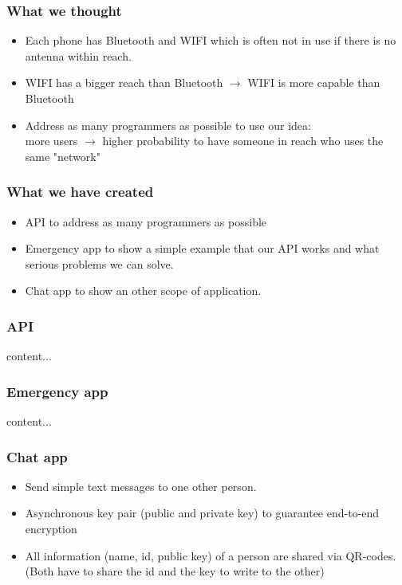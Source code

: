 \documentclass[11pt]{beamer}
\begin{document}
	\begin{frame}
		\frametitle{What we thought}
		\begin{itemize}
			\item Each phone has Bluetooth and WIFI which is often not in use if there is no antenna within reach.
			\item WIFI has a bigger reach than Bluetooth $ \rightarrow $ WIFI is more capable than Bluetooth
			\item Address as many programmers as possible to use our idea:\\
				more users $ \rightarrow $ higher probability to have someone in reach who uses the same "network"
		\end{itemize}
	\end{frame}
	
	\begin{frame}
		\frametitle{What we have created}
		\begin{itemize}
			\item API to address as many programmers as possible
			\item Emergency app to show a simple example that our API works and what serious problems we can solve.
			\item Chat app to show an other scope of application.
		\end{itemize}
	\end{frame}
	
	\begin{frame}
		\frametitle{API}
		content...
	\end{frame}
	
	\begin{frame}
		\frametitle{Emergency app}
		content...
	\end{frame}
	
	\begin{frame}
		\frametitle{Chat app}
		\begin{itemize}
			\item Send simple text messages to one other person.
			\item Asynchronous key pair (public and private key) to guarantee end-to-end encryption
			\item All information (name, id, public key) of a person are shared via QR-codes. (Both have to share the id and the key to write to the other)
		\end{itemize}
	\end{frame}
	
\end{document}
